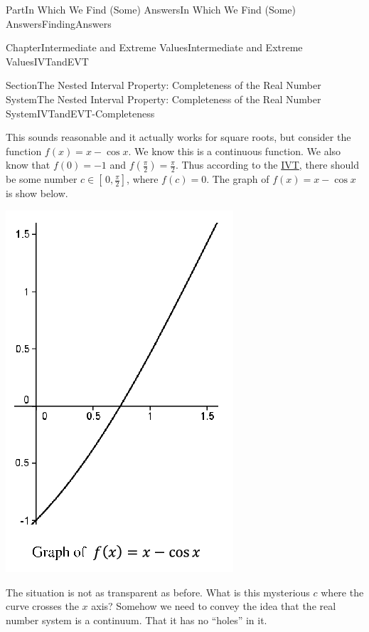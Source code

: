 \documentclass[oneside,10pt,]{book}
\numberwithin{equation}{part}
\begin{document}
\begin{partptx}{Part}{In Which We Find (Some) Answers}{}{In Which We Find (Some) Answers}{}{}{FindingAnswers}
\begin{chapterptx}{Chapter}{Intermediate and Extreme Values}{}{Intermediate and Extreme Values}{}{}{IVTandEVT}
\begin{sectionptx}{Section}{The Nested Interval Property: Completeness of the Real Number System}{}{The Nested Interval Property: Completeness of the Real Number System}{}{}{IVTandEVT-Completeness}
\par
This sounds reasonable and it actually works for square roots, but consider the function \(f(x)=x-\cos x\).  We know this is a continuous function.  We also know that \(f(0)=-1\) and \(f(\frac{\pi}{2})=\frac{\pi}{2}\).  Thus according to the \hyperref[IntermediateValueTheorem]{IVT}, there should be some number \(c\in[\,0,\frac{\pi}{2}]\), where \(f(c)=0\).  The graph of \(f(x)=x-\cos x\) is show below.%
\begin{image}{0.315}{0.37}{0.315}{}%
\includegraphics[width=\linewidth]{external/images/Ch6fig2.png}
\end{image}%
The situation is not as transparent as before.  What is this mysterious \(c\)  where the curve crosses the \(x\) axis?  Somehow we need to convey the idea that the real number system is a continuum.  That  it has no ``holes'' in it.%

\end{sectionptx}
\end{chapterptx}
\end{partptx}
\end{document}
